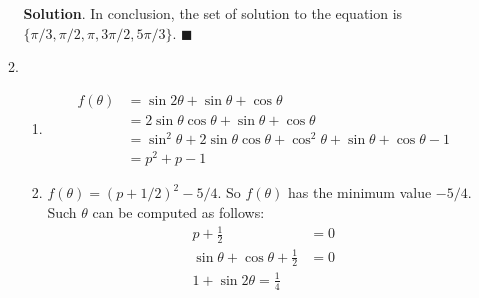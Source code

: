 \documentclass[12pt]{article}
\newenvironment*{sol}{\par \textbf{Solution}.}{\hfill$\blacksquare$}
\begin{document}
\begin{enumerate}
\begin{enumerate}
\begin{sol}
                In conclusion, the set of solution to the equation is $\{\pi/3,\pi/2,\pi,3\pi/2,5\pi/3\}$.
            \end{sol}
            \item \begin{enumerate}
                \item \begin{align*}
                    f(\theta)&=\sin{2\theta}+\sin{\theta}+\cos{\theta}\\
                    &=2\sin{\theta}\cos{\theta}+\sin{\theta}+\cos{\theta}\\
                    &=\sin^2{\theta}+2\sin{\theta}\cos{\theta}+\cos^2{\theta}+\sin{\theta}+\cos{\theta}-1\\
                    &=p^2+p-1
                \end{align*}
                \item $f(\theta)=(p+1/2)^2-5/4$. So $f(\theta)$ has the minimum value $-5/4$. Such $\theta$ can be computed as follows:\begin{align*}
                    p+\frac{1}{2}&=0\\
                    \sin{\theta}+\cos{\theta}+\frac{1}{2}&=0\\
                    1+\sin{2\theta}=\frac{1}{4}\\
                    
                \end{align*}
            \end{enumerate}
        \end{enumerate}
    \end{enumerate}
\end{document}
